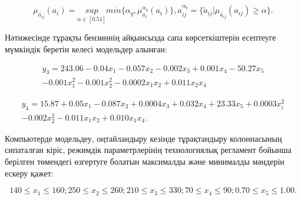 \begin{equation}
\mu_{\tilde{a_{ij}}}(a_i)=\underset{\alpha \in [0.51]}{sup}min\{\alpha_q,\mu_{a_i}^{\alpha_q}(a_i)\},a_{ij}^{\alpha_q}=\{\tilde{a}_{ij}|\mu_{\tilde{a_{ij}}}(a_{ij})\geq \alpha\}.
\end{equation}

Нәтижесінде тұрақты бензиннің айқынсызда сапа көрсеткіштерін есептеуге
мүмкіндік беретін келесі модельдер алынған:

\begin{multline}
y_3 = 243.06 - 0.04x_1 - 0.057x_2 - 0.002x_3 + 0.001x_4 - 50.27x_5 \\
- 0.001x_1^2 - 0.001x_2^2 - 0.0002x_1x_2 + 0.011x_2x_4
\end{multline}

\begin{multline}
y_4=15.87+0.05x_1-0.087x_2+0.0004x_3+0.032x_4+23.33x_5+0.0003x_i^2 \\
-0.002x_2^2-0.011x_1x_2+0.010x_1x_4.
\end{multline}

\begin{multicols}{2}
Компьютерде модельдеу, оңтайландыру кезінде тұрақтандыру колоннасының
сипаталған кіріс, режимдік параметрлерінің технологиялық регламент
бойынша берілген төмендегі өзгертуге болатын максималды және минималды
мәндерін ескеру қажет:
\end{multicols}

\begin{equation}
140\leq x_1 \leq 160;250\leq x_2\leq 260;210\leq x_3\leq 330;70\leq x_4\leq 90;0.70\leq x_5\leq 1.00.
\end{equation}

